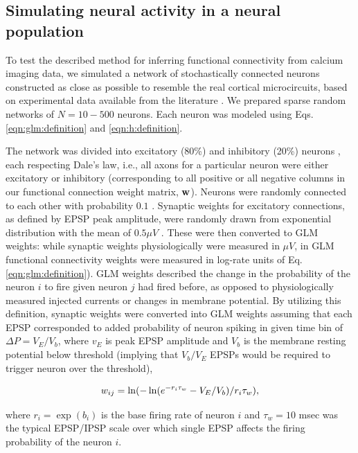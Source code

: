 \subsection{Simulating neural activity in a neural population} \label{sec:results:simulations}

To test the described method for inferring functional connectivity from calcium imaging data, we simulated a network of stochastically connected neurons constructed as close as possible to resemble the real cortical microcircuits, based on experimental data available from the literature \cite{Braitenberg1998, Urquijo2000, Lefort2009, Sayer1990}.  We prepared sparse random networks of $N=10-500$ neurons. Each neuron was modeled using Eqs. \eqref{eqn:glm:definition} and \eqref{eqn:h:definition}.

The network was divided into excitatory (80\%) and inhibitory (20\%) neurons \cite{Braitenberg1998, Urquijo2000}, each respecting Dale's law, i.e., all axons for a particular neuron were either excitatory or inhibitory (corresponding to all positive or all negative columns in our functional connection weight matrix, $\mathbf{w}$). Neurons were randomly connected to each other with probability $0.1$ \cite{Braitenberg1998, Lefort2009}.  Synaptic weights for excitatory connections, as defined by EPSP peak amplitude, were randomly drawn from exponential distribution with the mean of $0.5 \mu V$ \cite{Lefort2009, Sayer1990}. These were then converted to GLM weights: while synaptic weights physiologically were measured in $\mu V$, in GLM functional connectivity weights were measured in log-rate units of Eq. \eqref{eqn:glm:definition}). GLM weights described the change in the probability of the neuron $i$ to fire given neuron $j$ had fired before, as opposed to physiologically measured injected currents or changes in membrane potential. By utilizing this definition, synaptic weights were converted into GLM weights assuming that each EPSP corresponded to added probability of neuron spiking in given time bin of $\Delta P = V_E/V_{b}$, where $v_E$ is peak EPSP amplitude and $V_b$ is the membrane resting potential below threshold (implying that $V_{b}/V_E$ EPSPs would be required to trigger neuron over the threshold),

\begin{equation}\label{eqn:convert}
\w_{ij}=\ln(-\ln(e^{-r_i\tau_w}-V_E/V_{b})/r_i\tau_w),
\end{equation}

\noindent where $r_i=\exp(b_i)$ is the base firing rate of neuron $i$ and $\tau_w=10$ msec was the typical EPSP/IPSP scale over which single EPSP affects the firing probability of the neuron $i$.  %
%

